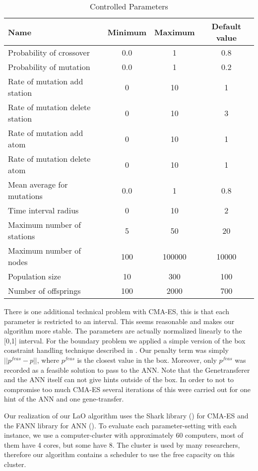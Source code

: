 \documentclass{acm_proc_article-sp}
\begin{document}
\begin{table*}[ht]
\centering
\begin{tabular}{l c c c}
\hline\hline
Name & Minimum & Maximum & Default value \\ 
\hline
Probability of crossover & 0.0 & 1 & 0.8 \\
Probability of mutation & 0.0& 1& 0.2 \\
Rate of mutation add station& 0& 10& 1 \\
Rate of mutation delete station& 0& 10& 3 \\
Rate of mutation add atom& 0& 10& 1 \\
Rate of mutation delete atom& 0& 10& 1 \\
Mean average for mutations& 0.0& 1& 0.8 \\
Time interval radius& 0& 10& 2 \\
Maximum number of stations& 5& 50& 20 \\
Maximum number of nodes& 100& 100000& 10000 \\
Population size& 10& 300& 100 \\
Number of offsprings& 100& 2000& 700 \\
\hline
\end{tabular}
\caption{Controlled Parameters}
\label{table:parameters}
\end{table*} 


There is one additional technical problem with CMA-ES, this is that each parameter is restricted to an interval. This seems reasonable and makes our algorithm more stable. The parameters are actually normalized linearly to the [0,1] interval. For the boundary problem we applied a simple version of the box constraint handling technique described in \cite{hansen2009tec}. Our penalty term was simply \begin{math}||p^{feas}-p|| \end{math}, where \begin{math}p^{feas}\end{math} is the closest value in the box. Moreover, only \begin{math}p^{feas}\end{math} was recorded as a feasible solution to pass to the ANN. Note that the Genetransferer and the ANN itself can not give hints outside of the box. In order to not to compromise too much CMA-ES several iterations of this were carried out for one hint of the ANN and one gene-transfer.

Our realization of our LaO algorithm uses the Shark library (\cite{shark08}) for CMA-ES and the FANN library for ANN (\cite{nissen}). To evaluate each parameter-setting with each instance, we use a computer-cluster with approximately 60 computers, most of them have 4 cores, but some have 8. The cluster is used by many researchers, therefore our algorithm contains a scheduler to use the free capacity on this cluster.
\end{document}
